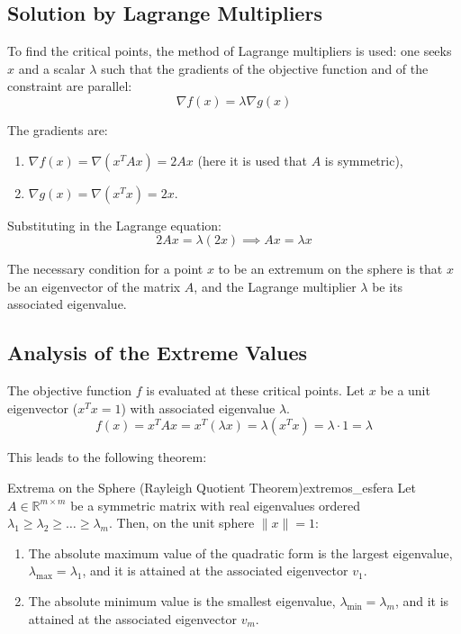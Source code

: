 \documentclass[11pt, a4paper]{article}
\begin{document}
\subsection{Solution by Lagrange Multipliers}

To find the critical points, the method of Lagrange multipliers is used: one seeks $x$ and a scalar $\lambda$ such that the gradients of the objective function and of the constraint are parallel:
\[ \nabla f(x) = \lambda \nabla g(x) \]

The gradients are:
\begin{enumerate}
    \item $\nabla f(x) = \nabla (x^T A x) = 2Ax$ (here it is used that $A$ is symmetric),
    \item $\nabla g(x) = \nabla (x^T x) = 2x$.
\end{enumerate}

Substituting in the Lagrange equation:
\[ 2Ax = \lambda (2x) \implies Ax = \lambda x \]

\obs The necessary condition for a point $x$ to be an extremum on the sphere is that $x$ be an eigenvector of the matrix $A$, and the Lagrange multiplier $\lambda$ be its associated eigenvalue.

\subsection{Analysis of the Extreme Values}

The objective function $f$ is evaluated at these critical points. Let $x$ be a unit eigenvector ($x^T x = 1$) with associated eigenvalue $\lambda$.
\[ f(x) = x^T A x = x^T (\lambda x) = \lambda (x^T x) = \lambda \cdot 1 = \lambda \]

This leads to the following theorem:

\begin{teorema}{Extrema on the Sphere (Rayleigh Quotient Theorem)}{extremos_esfera}
Let $A \in \mathbb{R}^{m \times m}$ be a symmetric matrix with real eigenvalues ordered $\lambda_1 \geq \lambda_2 \geq \dots \geq \lambda_m$.
Then, on the unit sphere $\|x\|=1$:
\begin{enumerate}
    \item The absolute maximum value of the quadratic form is the largest eigenvalue, $\lambda_{\max} = \lambda_1$, and it is attained at the associated eigenvector $v_1$.
    \item The absolute minimum value is the smallest eigenvalue, $\lambda_{\min} = \lambda_m$, and it is attained at the associated eigenvector $v_m$.
\end{enumerate}
\end{teorema}
\end{document}

